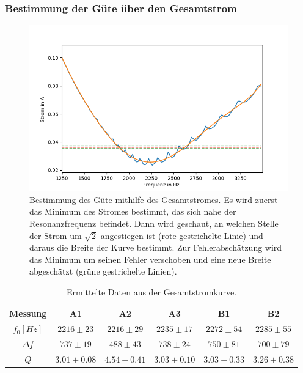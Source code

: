\documentclass[12pt,a4paper]{article}
\begin{document}
\subsubsection{Bestimmung der Güte über den Gesamtstrom}
\begin{figure}
\centering
\includegraphics[scale=0.8]{Bilder/Parallel_Iges.png}
\caption{Bestimmung des Güte mithilfe des Gesamtstromes. Es wird zuerst das Minimum des Stromes bestimmt, das sich nahe der Resonanzfrequenz befindet. Dann wird geschaut, an welchen Stelle der Strom um $\sqrt{2}$ angestiegen ist (rote gestrichelte Linie) und daraus die Breite der Kurve bestimmt. Zur Fehlerabschätzung wird das Minimum um seinen Fehler verschoben und eine neue Breite abgeschätzt (grüne gestrichelte Linien). }
\label{fig:parallel_Iges}
\end{figure}

\begin{table}
\centering
\begin{tabular}{|c|c|c|c||c|c|}
\hline
Messung & A1 & A2 & A3 & B1 & B2\\
\hline
$f_0[Hz]$ & $2216\pm 23 $ & $2216\pm 29 $ & $2235\pm 17$ & $2272\pm 54$ & $2285\pm 55$\\
\hline
$\Delta f$ & $737\pm 19 $ & $488\pm 43 $ & $738\pm 24$ & $750\pm 81$ & $700\pm 79$\\
\hline
$Q$ & $3.01\pm 0.08 $ & $4.54\pm 0.41 $ & $3.03\pm 0.10$ & $3.03\pm 0.33$ & $3.26\pm 0.38$\\
\hline
\end{tabular}
\label{tab:parallel_methode1}
\caption{Ermittelte Daten aus der Gesamtstromkurve.}
\end{table}
\end{document}
